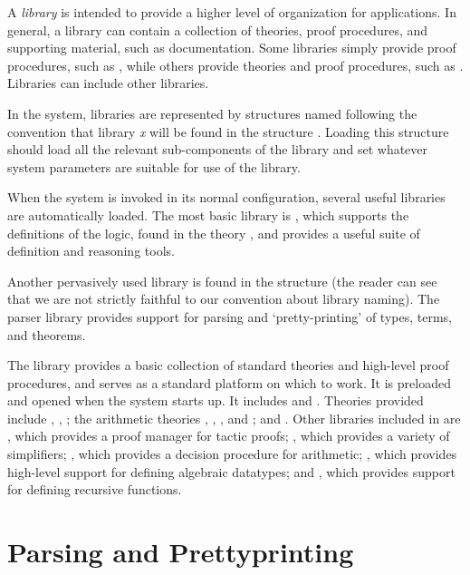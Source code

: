 {
 \newcommand{\term}      {\mbox{\it term}}
 \newcommand{\vstr}      {\mbox{\it vstr}}

A \emph{library} is intended to provide a higher level of
organization for \HOL{} applications. In general, a library
can contain a collection of theories, proof procedures,
and supporting material, such as documentation. Some libraries
simply provide proof procedures, such as ,
while others provide theories and proof procedures, such as
. Libraries can include other libraries.

In the \HOL{} system, libraries are represented by \ML{} structures
named following the convention that library \emph{x} will be found in
the \ML{} structure . Loading this structure should load all
the relevant sub-components of the library and set whatever system
parameters are suitable for use of the library.

When the \HOL{} system is invoked in its normal configuration, several
useful libraries are automatically loaded. The most basic \HOL{}
library is , which supports the definitions of
the \HOL{} logic, found in the theory , and provides a
useful suite of definition and reasoning tools.

Another pervasively used library is found in the structure 
(the reader can see that we are not strictly faithful to our
convention about library naming). The parser library provides support
for parsing and `pretty-printing' of \HOL{} types, terms, and
theorems.

The  library provides a basic collection of standard
theories and high-level proof procedures, and serves as a standard
platform on which to work. It is preloaded and opened when the \HOL{}
system starts up. It includes  and
. Theories provided include ,
, ; the arithmetic theories
, , ,
and ; and . Other libraries
included in  are , which provides
a proof manager for tactic proofs; , which provides
a variety of simplifiers; , which provides a decision
procedure for arithmetic; , which provides
high-level support for defining algebraic datatypes; and ,
which provides support for defining recursive functions.


\section{Parsing and Prettyprinting}

}
